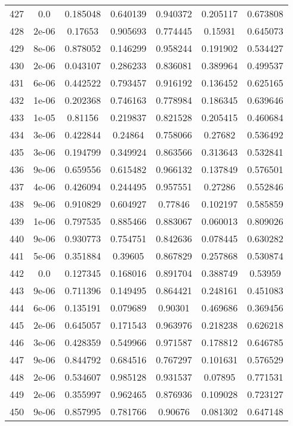 \begin{table}
\begin{tabular*}{\linewidth}{c|c|c|c|c|c|c}
427 & 0.0 & 0.185048 & 0.640139 & 0.940372 & 0.205117 & 0.673808\\
428 & 2e-06 & 0.17653 & 0.905693 & 0.774445 & 0.15931 & 0.645073\\
429 & 8e-06 & 0.878052 & 0.146299 & 0.958244 & 0.191902 & 0.534427\\
430 & 2e-06 & 0.043107 & 0.286233 & 0.836081 & 0.389964 & 0.499537\\
431 & 6e-06 & 0.442522 & 0.793457 & 0.916192 & 0.136452 & 0.625165\\
432 & 1e-06 & 0.202368 & 0.746163 & 0.778984 & 0.186345 & 0.639646\\
433 & 1e-05 & 0.81156 & 0.219837 & 0.821528 & 0.205415 & 0.460684\\
434 & 3e-06 & 0.422844 & 0.24864 & 0.758066 & 0.27682 & 0.536492\\
435 & 3e-06 & 0.194799 & 0.349924 & 0.863566 & 0.313643 & 0.532841\\
436 & 9e-06 & 0.659556 & 0.615482 & 0.966132 & 0.137849 & 0.576501\\
437 & 4e-06 & 0.426094 & 0.244495 & 0.957551 & 0.27286 & 0.552846\\
438 & 9e-06 & 0.910829 & 0.604927 & 0.77846 & 0.102197 & 0.585859\\
439 & 1e-06 & 0.797535 & 0.885466 & 0.883067 & 0.060013 & 0.809026\\
440 & 9e-06 & 0.930773 & 0.754751 & 0.842636 & 0.078445 & 0.630282\\
441 & 5e-06 & 0.351884 & 0.39605 & 0.867829 & 0.257868 & 0.530874\\
442 & 0.0 & 0.127345 & 0.168016 & 0.891704 & 0.388749 & 0.53959\\
443 & 9e-06 & 0.711396 & 0.149495 & 0.864421 & 0.248161 & 0.451083\\
444 & 6e-06 & 0.135191 & 0.079689 & 0.90301 & 0.469686 & 0.369456\\
445 & 2e-06 & 0.645057 & 0.171543 & 0.963976 & 0.218238 & 0.626218\\
446 & 3e-06 & 0.428359 & 0.549966 & 0.971587 & 0.178812 & 0.646785\\
447 & 9e-06 & 0.844792 & 0.684516 & 0.767297 & 0.101631 & 0.576529\\
448 & 2e-06 & 0.534607 & 0.985128 & 0.931537 & 0.07895 & 0.771531\\
449 & 2e-06 & 0.355997 & 0.962465 & 0.876936 & 0.109028 & 0.723127\\
450 & 9e-06 & 0.857995 & 0.781766 & 0.90676 & 0.081302 & 0.647148\\
\end{tabular*}
\end{table}
